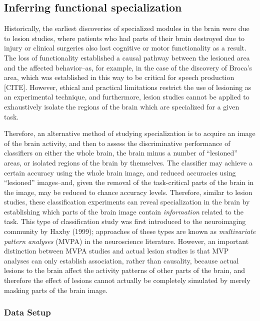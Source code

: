 \subsection{Inferring functional specialization}\label{sec:searchlight}

Historically, the earliest discoveries
of specialized modules in the brain were due to lesion studies, where
patients who had parts of their brain destroyed due to injury or
clinical surgeries also lost cognitive or motor functionality as a
result.  The loss of functionality established a causal pathway
between the lesioned area and the affected behavior--as, for example,
in the case of the discovery of Broca's area, which was established in
this way to be critical for speech production [CITE].  However,
ethical and practical limitations restrict the use of lesioning as an
experimental technique, and furthermore, lesion studies cannot be
applied to exhaustively isolate the regions of the brain which are
specialized for a given task.

Therefore, an alternative method of studying specialization is to
acquire an image of the brain activity, and then to assess the
discriminative performance of classifiers on either the whole brain,
the brain minus a number of ``lesioned'' areas, or isolated regions of
the brain by themselves.  The classifier may achieve a certain
accuracy using the whole brain image, and reduced accuracies using
``lesioned'' images--and, given the removal of the task-critical parts
of the brain in the image, may be reduced to chance accuracy levels.
Therefore, similar to lesion studies, these classification experiments
can reveal specialization in the brain by establishing which parts of
the brain image contain \emph{information} related to the task.  This
type of classification study was first introduced to the neuroimaging
community by Haxby (1999); approaches of these types are known as
\emph{multivariate pattern analyses} (MVPA) in the neuroscience
literature. However, an important distinction between MVPA studies and
actual lesion studies is that MVP analyses can only establish
association, rather than causality, because actual lesions to the
brain affect the activity patterns of other parts of the brain, and
therefore the effect of lesions cannot actually be completely
simulated by merely masking parts of the brain image.

\subsubsection{Data Setup}

